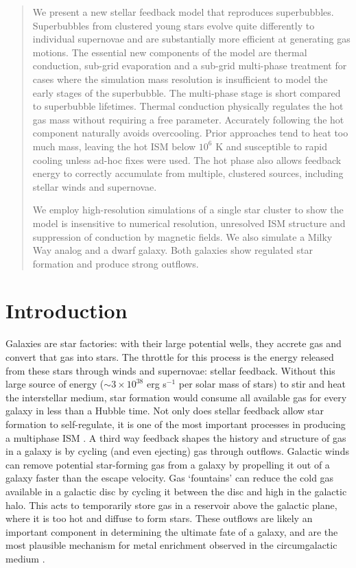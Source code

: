 \setcounter{pageFix}{\value{page}}
\begin{abstract}
\thispagestyle{fancy}
    \setcounter{page}{\value{pageFix}}
We present a new stellar feedback model that reproduces superbubbles.
Superbubbles from clustered young stars evolve quite differently to individual
supernovae and are substantially more efficient at generating gas motions.  The
essential new components of the model are thermal conduction, sub-grid
evaporation and a sub-grid multi-phase treatment for cases where the simulation
mass resolution is insufficient to model the early stages of the superbubble.
The multi-phase stage is short compared to superbubble lifetimes.  Thermal
conduction physically regulates the hot gas mass without requiring a free
parameter.  Accurately following the hot component naturally avoids overcooling.
Prior approaches tend to heat too much mass, leaving the hot ISM below $10^6$ K
and susceptible to rapid cooling unless ad-hoc fixes were used.  The hot
phase also allows feedback energy to correctly accumulate from multiple,
clustered sources, including stellar winds and supernovae.

We employ high-resolution simulations of a single star cluster to show the model
is insensitive to numerical resolution, unresolved ISM structure and suppression
of conduction by magnetic fields.  We also simulate a Milky Way analog and a
dwarf galaxy.  Both galaxies show regulated star formation and produce 
strong outflows.
\end{abstract}

\section{Introduction}
Galaxies are star factories:  with their large potential wells, they accrete gas
and convert that gas into stars.  The throttle for this process
is the energy released from these stars through winds and supernovae: stellar
feedback.  Without this large source of energy ($\sim 3\times 10^{38}$ erg
s$^{-1}$ per solar mass of stars) to stir and heat the interstellar medium, star
formation would consume all available gas for every galaxy in less than a Hubble
time.  Not only does stellar feedback allow star formation to self-regulate, it
is one of the most important processes in producing a multiphase ISM
\citep{McKee1977}.  A third way feedback shapes the history and structure of gas
in a galaxy is by cycling (and even ejecting) gas through outflows.  Galactic
winds can remove potential star-forming gas from a galaxy by propelling it out
of a galaxy faster than the escape velocity.  Gas `fountains' can reduce the
cold gas available in a galactic disc by cycling it between the disc and high in
the galactic halo. This acts to temporarily store gas in a reservoir above the
galactic plane, where it is too hot and diffuse to form stars.  These outflows
are likely an important component in determining the ultimate fate of a galaxy,
and are the most plausible mechanism for metal enrichment observed in the
circumgalactic medium \citep{Songaila1996,Dave1998}.

